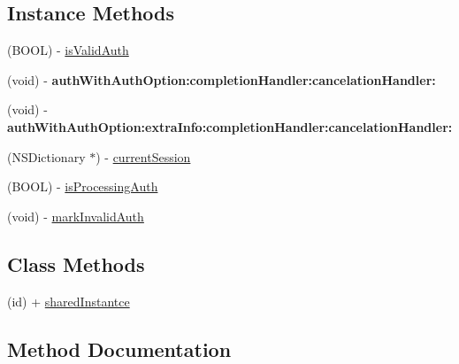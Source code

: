 \subsection*{Instance Methods}
\begin{DoxyCompactItemize}
\item 
(B\+O\+OL) -\/ \mbox{\hyperlink{protocol_mtop_auth_protocol_01-p_a4f8603bfb09ac35ab57b1c0648e4a7b4}{is\+Valid\+Auth}}
\item 
\mbox{\label{protocol_mtop_auth_protocol_01-p_a0c29db5c90067ac6e8e1d758b1765892}} 
(void) -\/ {\bfseries auth\+With\+Auth\+Option\+:completion\+Handler\+:cancelation\+Handler\+:}
\item 
\mbox{\label{protocol_mtop_auth_protocol_01-p_a0a16649f119e8ea1ecc97537a79f3190}} 
(void) -\/ {\bfseries auth\+With\+Auth\+Option\+:extra\+Info\+:completion\+Handler\+:cancelation\+Handler\+:}
\item 
(N\+S\+Dictionary $\ast$) -\/ \mbox{\hyperlink{protocol_mtop_auth_protocol_01-p_a1f6078a2b62ba1553a36943648592cfa}{current\+Session}}
\item 
(B\+O\+OL) -\/ \mbox{\hyperlink{protocol_mtop_auth_protocol_01-p_a9bb8d09ce1a17e670edd7d28f57c8b31}{is\+Processing\+Auth}}
\item 
(void) -\/ \mbox{\hyperlink{protocol_mtop_auth_protocol_01-p_ad6d38714fb89dd30fdfaef1c0b7dfae8}{mark\+Invalid\+Auth}}
\end{DoxyCompactItemize}
\subsection*{Class Methods}
\begin{DoxyCompactItemize}
\item 
(id) + \mbox{\hyperlink{protocol_mtop_auth_protocol_01-p_a1e5ad2e5b6d6a7cc283efc86ef7eed81}{shared\+Instantce}}
\end{DoxyCompactItemize}


\subsection{Method Documentation}
\mbox{\label{protocol_mtop_auth_protocol_01-p_a1f6078a2b62ba1553a36943648592cfa}} 
